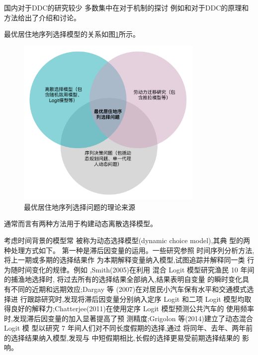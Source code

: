 \documentclass[a4paper,12pt,oneside]{book} %
\begin{document}
国内对于DDC的研究较少
多数集中在对于机制的探讨
例如\cite{QinSongDongTaiChiSanXuanZeMoXingJiQiGuJiFangFaFaZhanZongShu2010}和\cite{MaYaQiDongTaiChiSanXuanZeMoXingDeMoNiFenXi2016}对于DDC的原理和方法给出了介绍和讨论。

最优居住地序列选择模型的关系如图\ref{fig:最优居住地序列选择问题的理论来源venn diagram}所示。

\begin{figure}[!ht]
\centering
\includegraphics[width=0.8\textwidth]{images/optimal_residential_sequence.drawio.pdf}
\caption{最优居住地序列选择问题的理论来源}
\label{fig:最优居住地序列选择问题的理论来源venn diagram}
\end{figure}

通常而言有两种方法用于构建动态离散选择模型。

考虑时间背景的模型常 被称为动态选择模型(dynamic choice model),其典 型的两种处理方式如下。 第一种是滞后因变量的运用。一些研究参照 时间序列分析方法,将上一期或多期的选择结果作 为本期解释变量纳入模型,试图追踪并解释同一类 行为随时间变化的规律。例如
,Smith(2005)在利用 混合 Logit 模型研究渔民 10 年间的捕渔地选择时, 将过去所有的选择结果全部纳入,结果表明自变量 的瞬时变化具有不同的近期和远期效应;Dargay 等 (2007)在对居民小汽车保有水平和交通模式选择进 行跟踪研究时,发现将滞后因变量分别纳入定序 Logit 和二项 Logit 模型均取得良好的解释力;Chatterjee(2011)在使用定序 Logit 模型预测公共汽车的 使用频率时,发现滞后因变量的加入显著提高了预 测精度;Grigolon 等(2014)建立了动态混合 Logit 模 型以研究 7 年间人们对不同长度假期的选择,通过 将同年、去年、两年前的选择结果纳入模型,发现与 中短假期相比,长假的选择更易受前期选择结果的 影响。
\end{document}
